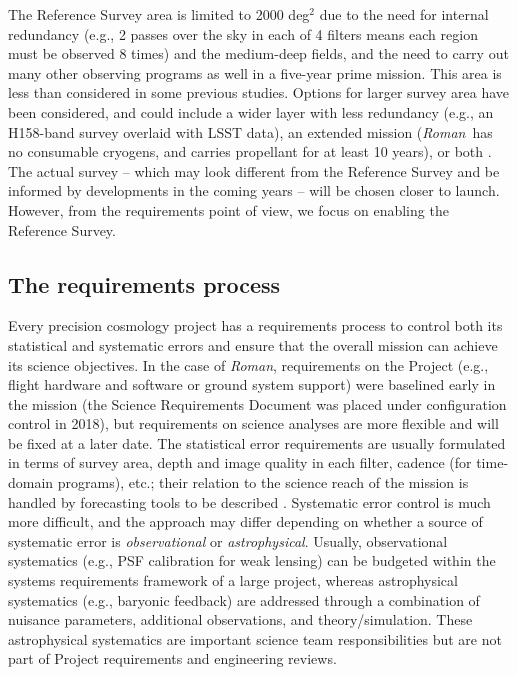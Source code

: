 \documentclass[usenatbib]{mnras}
\newcommand{\wfirst}{{\slshape Roman}}
\newcommand{\changetext}[1]{\textcolor{red}{#1}}
\begin{document}
The Reference Survey area is limited to 2000 deg$^2$ due to the need for internal redundancy (e.g., 2 passes over the sky in each of 4 filters means each region must be observed 8 times) and the medium-deep fields, and the need to carry out many other observing programs as well in a five-year prime mission. This area is less than considered in some previous studies. Options for larger survey area have been considered, and could include a wider layer with less redundancy (e.g., an H158-band survey overlaid with LSST data), an extended mission (\wfirst\ has no consumable cryogens, and carries propellant for at least 10 years), or both \citep{2019BAAS...51c.418E}. The actual survey -- which may look different from the Reference Survey and be informed by developments in the coming years -- will be chosen closer to launch. However, from the requirements point of view, we focus on enabling the Reference Survey.

\subsection{The requirements process}
\label{ss:req}

Every precision cosmology project has a requirements process to control both its statistical and systematic errors and ensure that the overall mission can achieve its science objectives. In the case of \wfirst, requirements on the Project (e.g., flight hardware and software or ground system support) were baselined early in the mission (the Science Requirements Document was placed under configuration control in 2018), but requirements on science analyses are more flexible and will be fixed at a later date. The statistical error requirements are usually formulated in terms of survey area, depth and image quality in each filter, cadence (for time-domain programs), etc.; their relation to the science reach of the mission is handled by forecasting tools to be described \changetext{\citep{2020arXiv200404702E, 2020arXiv200405271E}}. Systematic error control is much more difficult, and the approach may differ depending on whether a source of systematic error is {\em observational} or {\em astrophysical}. Usually, observational systematics (e.g., PSF calibration for weak lensing) can be budgeted within the systems requirements framework of a large project, whereas astrophysical systematics (e.g., baryonic feedback) are addressed through a combination of nuisance parameters, additional observations, and theory/simulation. These astrophysical systematics are important science team responsibilities but are not part of Project requirements and engineering reviews.
\end{document}
